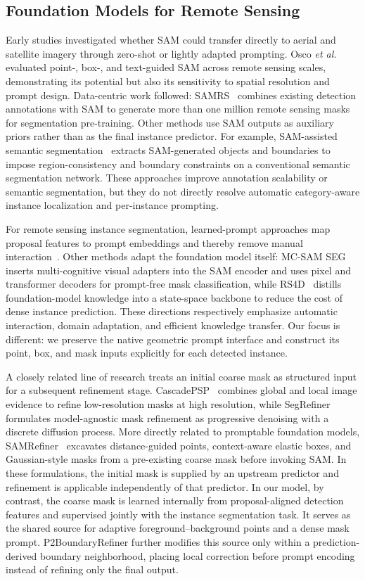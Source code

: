 \documentclass[letterpaper,journal]{IEEEtran}
\begin{document}
\subsection{Foundation Models for Remote Sensing}
Early studies investigated whether SAM could transfer directly to aerial and satellite imagery through zero-shot or lightly adapted prompting. Osco \textit{et al.}~\cite{ref_samrsapp} evaluated point-, box-, and text-guided SAM across remote sensing scales, demonstrating its potential but also its sensitivity to spatial resolution and prompt design. Data-centric work followed: SAMRS~\cite{ref_samrs} combines existing detection annotations with SAM to generate more than one million remote sensing masks for segmentation pre-training. Other methods use SAM outputs as auxiliary priors rather than as the final instance predictor. For example, SAM-assisted semantic segmentation~\cite{ref_samassist} extracts SAM-generated objects and boundaries to impose region-consistency and boundary constraints on a conventional semantic segmentation network. These approaches improve annotation scalability or semantic segmentation, but they do not directly resolve automatic category-aware instance localization and per-instance prompting.

For remote sensing instance segmentation, learned-prompt approaches map proposal features to prompt embeddings and thereby remove manual interaction~\cite{ref_rsprompter}. Other methods adapt the foundation model itself: MC-SAM SEG~\cite{ref_mcsamseg} inserts multi-cognitive visual adapters into the SAM encoder and uses pixel and transformer decoders for prompt-free mask classification, while RS4D~\cite{ref_rs4d} distills foundation-model knowledge into a state-space backbone to reduce the cost of dense instance prediction. These directions respectively emphasize automatic interaction, domain adaptation, and efficient knowledge transfer. Our focus is different: we preserve the native geometric prompt interface and construct its point, box, and mask inputs explicitly for each detected instance.

A closely related line of research treats an initial coarse mask as structured input for a subsequent refinement stage. CascadePSP~\cite{ref_cascadepsp} combines global and local image evidence to refine low-resolution masks at high resolution, while SegRefiner~\cite{ref_segrefiner} formulates model-agnostic mask refinement as progressive denoising with a discrete diffusion process. More directly related to promptable foundation models, SAMRefiner~\cite{ref_samrefiner} excavates distance-guided points, context-aware elastic boxes, and Gaussian-style masks from a pre-existing coarse mask before invoking SAM. In these formulations, the initial mask is supplied by an upstream predictor and refinement is applicable independently of that predictor. In our model, by contrast, the coarse mask is learned internally from proposal-aligned detection features and supervised jointly with the instance segmentation task. It serves as the shared source for adaptive foreground--background points and a dense mask prompt. P2BoundaryRefiner further modifies this source only within a prediction-derived boundary neighborhood, placing local correction before prompt encoding instead of refining only the final output.
\end{document}
